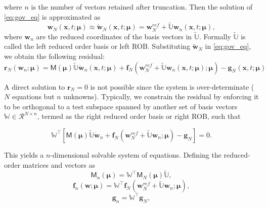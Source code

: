 \documentclass[11pt]{article}
\renewcommand{\vec}[1]{\mathbf{#1}}
\newcommand{\mat}[1]{\mathsf{#1}}
\begin{document}
where $n$ is the number of vectors retained after truncation.
Then the solution of \cref{eq:gov_eq} is approximated as
\begin{equation}
\vec{w}_N(\vec{x},t; \boldsymbol{\mu}) \approx \widetilde{\vec{w}}_N(\vec{x},t; \boldsymbol{\mu}) = \vec{w}^{ref}_N+\widetilde{\mathbb{U}}  \vec{w}_n(\vec{x},t; \boldsymbol{\mu}),
\label{eq:w_ned_gal}
\end{equation}
where $\vec{w}_n$ are the reduced coordinates of the basis vectors in $\widetilde{\mathbb{U}}$.
Formally $\widetilde{\mathbb{U}}$ is called the left reduced order basis or left ROB.
Substituting $\widetilde{\vec{w}}_N$ in \cref{eq:gov_eq}, we obtain the following residual:
\begin{equation}
\vec{r}_{N}(\vec{w}_n;\boldsymbol{\mu}) = \mat{M}(\boldsymbol{\mu})\widetilde{\mathbb{U}}\dot{\vec{w}}_n(\vec{x},t; \boldsymbol{\mu}) + \vec{f}_N(\vec{w}^{ref}_N+\widetilde{\mathbb{U}}\vec{w}_n(\vec{x},t; \boldsymbol{\mu}); \boldsymbol{\mu}) - \vec{g}_N(\vec{x},t; \boldsymbol{\mu})
\label{eq:residual_gov_eq_gal}
\end{equation}


A direct solution to $\vec{r}_N=0$ is not possible since the system is over-determinate ($N$ equations but $n$ unknowns).
Typically, we constrain the residual by enforcing it to be orthogonal to a test subspace spanned by another set of basis vectors ${\mathbb{W}}\in\mathcal{R}^{N\times n}$, termed as the right reduced order basis or right ROB, such that

\begin{equation}
\mathbb{W}^\top \left[ \mat{M}(\boldsymbol{\mu}) \widetilde{\mathbb{U}} \dot{\vec{w}}_n + \vec{f}_N(\vec{w}^{ref}_N+\widetilde{\mathbb{U}} \vec{w}_n; \boldsymbol{\mu}) - \vec{g}_N \right] = 0.
\label{eq:PG_projection}
\end{equation}

This yields a $n$-dimensional solvable system of equations.
Defining the reduced-order matrices and vectors as
\begin{equation}
\mat{M}_{n}(\boldsymbol{\mu}) = \mathbb{W}^\top \mat{M}_{N}(\boldsymbol{\mu}) \widetilde{\mathbb{U}},
\end{equation}
\begin{equation}
\vec{f}_n(\vec{w}; \boldsymbol{\mu}) = \mathbb{W}^\top \vec{f}_N(\vec{w}^{ref}_N+\widetilde{\mathbb{U}} \vec{w}_n; \boldsymbol{\mu}),
\end{equation}
\begin{equation}
\vec{g}_n = \mathbb{W}^\top \vec{g}_N,
\end{equation}
\end{document}
